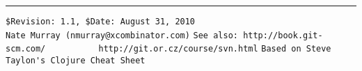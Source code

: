 \documentclass[footexclude,twocolumn,DIV25,fontsize=10pt]{scrreprt}
\begin{document}
\begin{flushright}
\footnotesize
\rule{0.7\linewidth}{0.25pt}
\verb!$Revision: 1.1, $Date: August 31, 2010!\\
\verb!Nate Murray (nmurray@xcombinator.com)!
\verb!See also: http://book.git-scm.com/!
\verb!          http://git.or.cz/course/svn.html!
\verb!Based on Steve Taylon's Clojure Cheat Sheet!
\end{flushright}

%
%
\end{document}
